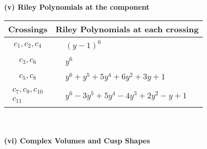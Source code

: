 \documentclass[1p]{elsarticle_modified}
\theoremstyle{definition}
\begin{document}
\newpage\renewcommand{\arraystretch}{1}
\flushleft \textbf{(v) Riley Polynomials at the component}\newline \\
\begin{tabular}{m{50pt}|m{274pt}}
Crossings & \hspace{64pt}Riley Polynomials at each crossing \\
\hline $$\begin{aligned}c_{1},c_{2},c_{4}\end{aligned}$$&$\begin{aligned}
&(y-1)^6
\end{aligned}$\\
\hline $$\begin{aligned}c_{3},c_{6}\end{aligned}$$&$\begin{aligned}
&y^6
\end{aligned}$\\
\hline $$\begin{aligned}c_{5},c_{8}\end{aligned}$$&$\begin{aligned}
&y^6+y^5+5 y^4+6 y^2+3 y+1
\end{aligned}$\\
\hline $$\begin{aligned}c_{7},c_{9},c_{10}\\c_{11}\end{aligned}$$&$\begin{aligned}
&y^6-3 y^5+5 y^4-4 y^3+2 y^2- y+1
\end{aligned}$\\
\hline
\end{tabular}\\~\\
\newpage\flushleft \textbf{(vi) Complex Volumes and Cusp Shapes}
\end{document}
